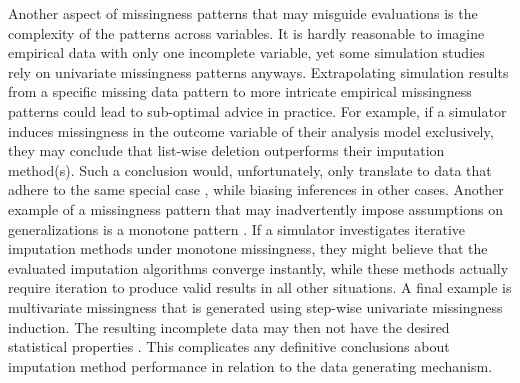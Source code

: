 \documentclass[bimj,fleqn]{w-art}
\begin{document}
Another aspect of missingness patterns that may misguide evaluations is the complexity of the patterns across variables. It is hardly reasonable to imagine empirical data with only one incomplete variable, yet some simulation studies rely on univariate missingness patterns anyways. Extrapolating simulation results from a specific missing data pattern to more intricate empirical missingness patterns could lead to sub-optimal advice in practice. For example, if a simulator induces missingness in the outcome variable of their analysis model exclusively, they may conclude that list-wise deletion outperforms their imputation method(s). Such a conclusion would, unfortunately, only translate to data that adhere to the same special case \citep[described in][\S 2.7]{fimd}, while biasing inferences in other cases. Another example of a missingness pattern that may inadvertently impose assumptions on generalizations is a monotone pattern \citep[i.e. a pattern with uniformly increasing missingness proportions along variables;][]{litt20}. If a simulator investigates iterative imputation methods under monotone missingness, they might believe that the evaluated imputation algorithms converge instantly, while these methods actually require iteration to produce valid results in all other situations. A final example is multivariate missingness that is generated using step-wise univariate missingness induction. The resulting incomplete data may then not have the desired statistical properties \citep[e.g. skewness;][]{ampute}. This complicates any definitive conclusions about imputation method performance in relation to the data generating mechanism.

\end{document}
